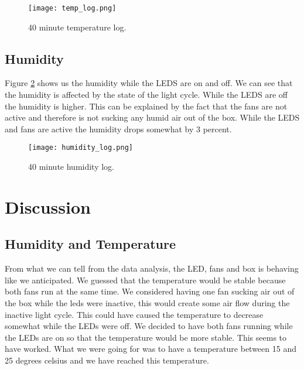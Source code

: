\documentclass[a4paper,12pt,twoside,openright,titlepage]{book}
\begin{document}
\begin{figure}[h]
    \begin{center}
        \label{temp_log}
        \texttt{[image: temp\_log.png]}
        \caption{40 minute temperature log.}
    \end{center}
\end{figure}

\section{Humidity}
Figure \ref{humidity_log} shows us the humidity while the LEDS are on and off. We can see that the humidity is affected by the state of the light cycle. While the LEDS are off the humidity is higher. This can be explained by the fact that the fans are not active and therefore is not sucking any humid air out of the box. While the LEDS and fans are active the humidity drops somewhat by 3 percent.

\begin{figure}[h]
    \begin{center}
        \label{humidity_log}
        \texttt{[image: humidity\_log.png]}
        \caption{40 minute humidity log.}
    \end{center}
\end{figure}



\chapter{Discussion}

\section{Humidity and Temperature}
From what we can tell from the data analysis, the LED, fans and box is behaving like we anticipated. We guessed that the temperature would be stable because both fans run at the same time. We considered having one fan sucking air out of the box while the leds were inactive, this would create some air flow during the inactive light cycle. This could have caused the temperature to decrease somewhat while the LEDs were off. We decided to have both fans running while the LEDs are on so that the temperature would be more stable. This seems to have worked. What we were going for was to have a temperature between 15 and 25 degrees celsius and we have reached this temperature.
\end{document}
